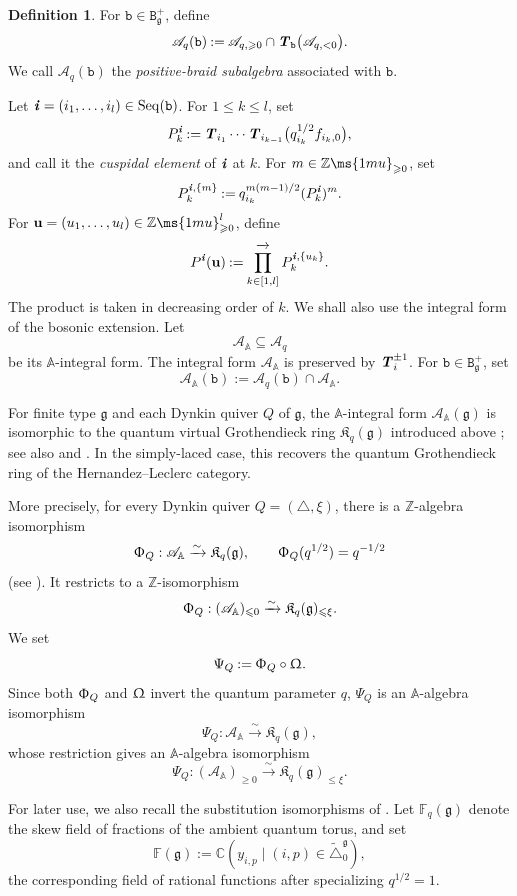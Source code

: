 \documentclass[12pt, leqno]{amsart}
\numberwithin{equation}{section}
\theoremstyle{plain}
\theoremstyle{definition}
\newtheorem{definition}[lemma]{Definition}
\renewcommand{\le}{\leqslant}
\renewcommand{\ge}{\geqslant}
\newcommand{\seteq}{\mathbin{:=}}
\newcommand{\g}{\mathfrak{g}}
\newcommand{\C}{\mathbb{C}}
\newcommand{\Z}{\mathbb{Z}\ms{1mu}}
\newcommand{\Dynkin}{\triangle}
\newcommand{\ii}{ \textbf{\textit{i}}}
\newcommand{\frakK}{\mathfrak{K}}
\newcommand{\bbA}{\mathbb{A}}
\newcommand{\bbF}{\mathbb{F}}
\newcommand{\bfu}{\mathbf{u}}
\newcommand{\scrA}{\mathscr{A}}
\newcommand{\ttB}{\mathtt{B}}
\newcommand{\ttb}{\mathtt{b}}
\newcommand{\tDynkin}{{\widetilde{\Dynkin}}}
\newcommand{\oprod}{\prod^{\xrightarrow{}}}
\newcommand{\TT}{ \textbf{\textit{T}}}
\newcommand{\Seq}{\mathrm{Seq}}
\begin{document}
\begin{definition} \cite{OP24,KKOP24B}
For $\ttb\in\ttB_\g^+$, define
\[
\scrA_q(\ttb) \seteq \scrA_{q,\ge0} \cap \TT_{\ttb}\bigl(\scrA_{q,<0}\bigr).
\]
We call $\scrA_q(\ttb)$ the \emph{positive-braid subalgebra}
associated with $\ttb$.
\end{definition}

Let $\ii=(i_1,\ldots,i_l)\in\Seq(\ttb)$.  For $1\le k\le l$, set
\[
P_k^\ii \seteq \TT_{i_1}\cdots \TT_{i_{k-1}} \bigl(q_{i_k}^{1/2}f_{i_k,0}\bigr),
\]
and call it the \emph{cuspidal element} of $\ii$ at $k$.
For $m\in\Z_{\ge0}$, set
\[
P_k^{\ii,\{m\}} \seteq q_{i_k}^{m(m-1)/2}(P_k^\ii)^m.
\]
For $\bfu=(u_1,\ldots,u_l)\in\Z_{\ge0}^l$, define
\[
P^\ii(\bfu) \seteq \oprod_{k\in[1,l]} P_k^{\ii,\{u_k\}}.
\]
The product is taken in decreasing order of $k$.
We shall also use the integral form of the bosonic extension.
Let
\[
\scrA_{\bbA} \subseteq \scrA_q
\]
be its $\bbA$-integral form. The integral form $\scrA_{\bbA}$ is preserved by
$\TT_i^{\pm1}$.  For $\ttb\in\ttB_\g^+$, set
\[
\scrA_{\bbA}(\ttb) \seteq \scrA_q(\ttb)\cap\scrA_{\bbA}.
\]

For finite type $\g$ and each Dynkin quiver $Q$ of $\g$, the $\bbA$-integral form
$\scrA_{\bbA}(\g)$ is isomorphic to the quantum virtual
Grothendieck ring $\frakK_q(\g)$ introduced above
\cite[Theorem~6.2]{KKOP25M}; see also \cite{HL15} and
\cite[Theorems~5.2 and~7.2]{JLO2}.  In the simply-laced case, this recovers the
quantum Grothendieck ring of the Hernandez--Leclerc category. 

 
More precisely, for every Dynkin quiver $Q=(\Dynkin,\xi)$, there is a
$\mathbb Z$-algebra isomorphism
\[
\Upphi_Q:\scrA_{\bbA}\xrightarrow{\sim}\frakK_q(\g),
\qquad
\Upphi_Q(q^{1/2})=q^{-1/2}
\]
(see \cite[Theorem 6.2]{KKOP25M}). 
It restricts to a $\mathbb Z$-isomorphism
\[
\Upphi_Q:
(\scrA_{\bbA})_{\le0}
\xrightarrow{\sim}
\frakK_q(\g)_{\le\xi}.
\]
We set
\[
\Psi_Q\seteq\Upphi_Q\circ\Upomega.
\]
Since both $\Upphi_Q$ and $\Upomega$ invert the quantum parameter $q$,
$\Psi_Q$ is an $\bbA$-algebra isomorphism
\[
\Psi_Q:\scrA_{\bbA}\xrightarrow{\sim}\frakK_q(\g),
\]
whose restriction gives an $\bbA$-algebra isomorphism
\[
\Psi_Q:
(\scrA_{\bbA})_{\ge0}
\xrightarrow{\sim}
\frakK_q(\g)_{\le\xi}.
\]
 

For later use, we also recall the substitution isomorphisms of
\cite{FHOO2,LO24}.  Let $\bbF_q(\g)$ denote the skew field of fractions
of the ambient quantum torus, and set
\[
\bbF(\g)\seteq\C(y_{i,p}\mid(i,p)\in\tDynkin_0^\g),
\]
the corresponding field of rational functions after specializing
$q^{1/2}=1$.
\end{document}
